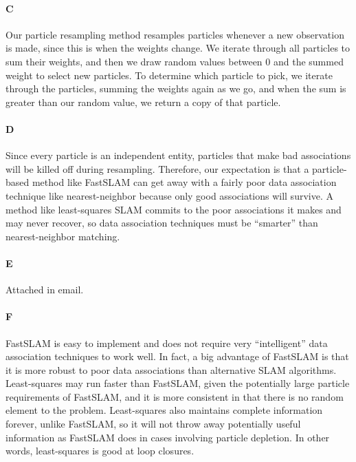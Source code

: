 \documentclass[12pt]{article}
\begin{document}
\paragraph{C}
Our particle resampling method resamples particles whenever a new observation
is made, since this is when the weights change. We iterate through all
particles to sum their weights, and then we draw random values between 0 and
the summed weight to select new particles. To determine which particle to pick,
we iterate through the particles, summing the weights again as we go, and when
the sum is greater than our random value, we return a copy of that particle.


\paragraph{D}
Since every particle is an independent entity, particles that make bad
associations will be killed off during resampling. Therefore, our
expectation is that a particle-based method like FastSLAM can get away
with a fairly poor data association technique like nearest-neighbor
because only good associations will survive. A method like least-squares
SLAM commits to the poor associations it makes and may never recover, so
data association techniques must be ``smarter'' than nearest-neighbor
matching.

\paragraph{E}
Attached in email.


\paragraph{F}
FastSLAM is easy to implement and does not require very ``intelligent'' data
association techniques to work well. In fact, a big advantage of FastSLAM is
that it is more robust to poor data associations than alternative SLAM
algorithms. Least-squares may run faster than FastSLAM, given the potentially
large particle requirements of FastSLAM, and it is more consistent in that
there is no random element to the problem. Least-squares also maintains
complete information forever, unlike FastSLAM, so it will not throw away
potentially useful information as FastSLAM does in cases involving particle
depletion. In other words, least-squares is good at loop closures.
\end{document}
